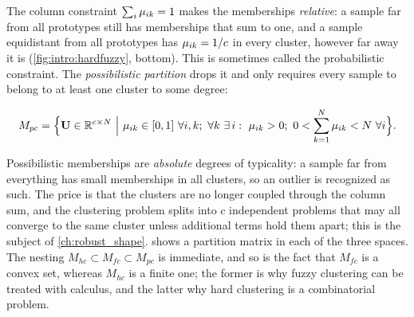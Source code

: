 The column constraint $\sum_i\mu_{ik}=1$ makes the memberships \emph{relative}: a sample far from all prototypes still has memberships that sum to one, and a sample equidistant from all prototypes has $\mu_{ik}=1/c$ in every cluster, however far away it is (\cref{fig:intro:hardfuzzy}, bottom). This is sometimes called the probabilistic constraint. The \emph{possibilistic partition} \cite{krishnapuram:1993:pcm} drops it and only requires every sample to belong to at least one cluster to some degree:
\begin{definition}\label{def:found:mpc}
\begin{equation}
  M_{pc}=\Bigl\{\U\in\R^{c\times N}\ \Big|\ \mik\in[0,1]\ \forall i,k;\ \forall k\ \exists\, i:\ \mik>0;\ 0<\sum_{k=1}^{N}\mik<N\ \forall i\Bigr\}.
  \label{eq:found:mpc}
\end{equation}
\end{definition}
Possibilistic memberships are \emph{absolute} degrees of typicality: a sample far from everything has small memberships in all clusters, so an outlier is recognized as such. The price is that the clusters are no longer coupled through the column sum, and the clustering problem splits into $c$ independent problems that may all converge to the same cluster unless additional terms hold them apart; this is the subject of \cref{ch:robust_shape}.  shows a partition matrix in each of the three spaces. The nesting $M_{hc}\subset M_{fc}\subset M_{pc}$ is immediate, and so is the fact that $M_{fc}$ is a convex set, whereas $M_{hc}$ is a finite one; the former is why fuzzy clustering can be treated with calculus, and the latter why hard clustering is a combinatorial problem.

